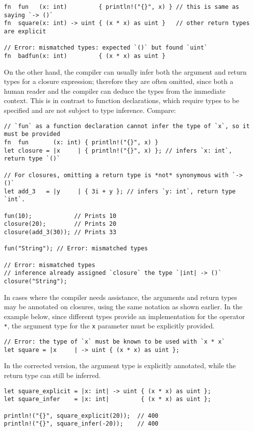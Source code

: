 \documentclass[]{article}
\begin{document}
\begin{verbatim}
fn  fun   (x: int)         { println!("{}", x) } // this is same as saying `-> ()`
fn  square(x: int) -> uint { (x * x) as uint }   // other return types are explicit

// Error: mismatched types: expected `()` but found `uint`
fn  badfun(x: int)         { (x * x) as uint }
\end{verbatim}

On the other hand, the compiler can usually infer both the argument and
return types for a closure expression; therefore they are often omitted,
since both a human reader and the compiler can deduce the types from the
immediate context. This is in contrast to function declarations, which
require types to be specified and are not subject to type inference.
Compare:

\begin{verbatim}
// `fun` as a function declaration cannot infer the type of `x`, so it must be provided
fn  fun       (x: int) { println!("{}", x) }
let closure = |x     | { println!("{}", x) }; // infers `x: int`, return type `()`

// For closures, omitting a return type is *not* synonymous with `-> ()`
let add_3   = |y     | { 3i + y }; // infers `y: int`, return type `int`.

fun(10);            // Prints 10
closure(20);        // Prints 20
closure(add_3(30)); // Prints 33

fun("String"); // Error: mismatched types

// Error: mismatched types
// inference already assigned `closure` the type `|int| -> ()`
closure("String");
\end{verbatim}

In cases where the compiler needs assistance, the arguments and return
types may be annotated on closures, using the same notation as shown
earlier. In the example below, since different types provide an
implementation for the operator \texttt{*}, the argument type for the
\texttt{x} parameter must be explicitly provided.

\begin{verbatim}
// Error: the type of `x` must be known to be used with `x * x`
let square = |x     | -> uint { (x * x) as uint };
\end{verbatim}

In the corrected version, the argument type is explicitly annotated,
while the return type can still be inferred.

\begin{verbatim}
let square_explicit = |x: int| -> uint { (x * x) as uint };
let square_infer    = |x: int|         { (x * x) as uint };

println!("{}", square_explicit(20));  // 400
println!("{}", square_infer(-20));    // 400
\end{verbatim}
\end{document}
